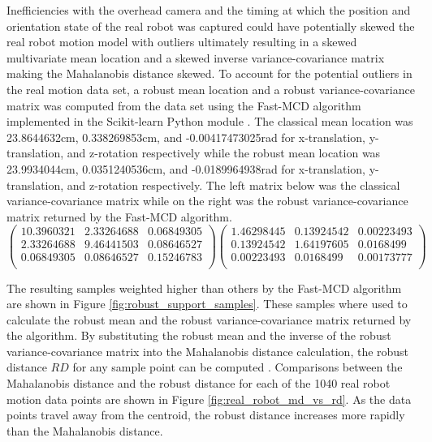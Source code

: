Inefficiencies with the overhead camera and the timing at which the position and orientation state of the real robot was captured could have potentially skewed the real robot motion model with outliers ultimately resulting in a skewed multivariate mean location and a skewed inverse variance-covariance matrix making the Mahalanobis distance skewed. To account for the potential outliers in the real motion data set, a robust mean location and a robust variance-covariance matrix was computed from the data set using the Fast-MCD algorithm implemented in the Scikit-learn Python module \cite{Rousseeuw:1999:FAM:331435.331458}\cite{scikit-learn}. The classical mean location was 23.8644632cm, 0.338269853cm, and -0.00417473025rad for x-translation, y-translation, and z-rotation respectively while the robust mean location was 23.9934044cm, 0.0351240536cm, and -0.0189964938rad for x-translation, y-translation, and z-rotation respectively. The left matrix below was the classical variance-covariance matrix while on the right was the robust variance-covariance matrix returned by the Fast-MCD algorithm.
\vspace{-1mm}
\[ \left( \begin{array}{ccc}
10.3960321 &  2.33264688 & 0.06849305 \\
2.33264688 &  9.46441503 & 0.08646527 \\
0.06849305 &  0.08646527 & 0.15246783 \\
\end{array} \right)
%
\left( \begin{array}{ccc}
1.46298445 & 0.13924542 & 0.00223493 \\
0.13924542 & 1.64197605 & 0.0168499  \\
0.00223493 & 0.0168499  & 0.00173777 \\
\end{array} \right)
\]

\noindent
The resulting samples weighted higher than others by the Fast-MCD algorithm are shown in Figure \ref{fig:robust_support_samples}. These samples where used to calculate the robust mean and the robust variance-covariance matrix returned by the algorithm. By substituting the robust mean and the inverse of the robust variance-covariance matrix into the Mahalanobis distance calculation, the robust distance $RD$ for any sample point can be computed \cite{WICS:WICS61}. Comparisons between the Mahalanobis distance and the robust distance for each of the 1040 real robot motion data points are shown in Figure \ref{fig:real_robot_md_vs_rd}. As the data points travel away from the centroid, the robust distance increases more rapidly than the Mahalanobis distance.  

